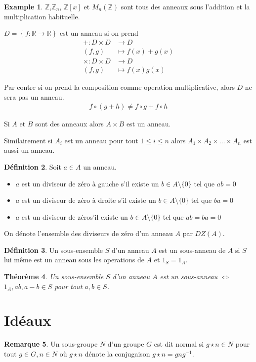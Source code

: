 \documentclass{book}
\theoremstyle{plain}
\newtheorem{thm}{Théorème}[chapter] %
\theoremstyle{definition}
\newtheorem{defn}[thm]{Définition} %
\newtheorem{ex}[thm]{Example} %
\newtheorem{rmrk}[thm]{Remarque}
\begin{document}
\begin{ex}
$\mathbb{Z}$,$\mathbb{Z}_n$, $\mathbb{Z}[x]$ et $M_n\left(\mathbb{Z}\right)$ sont tous des anneaux sous l'addition et la multiplication habituelle.

$D=\left\{ f:\mathbb{R}\rightarrow\mathbb{R}\right\}$ est un anneau si on prend
\begin{align*}
+:D\times D&\rightarrow D\\
(f,g)&\mapsto f(x)+g(x)\\
\times:D\times D&\rightarrow D\\
(f,g)&\mapsto f(x)g(x)
\end{align*}

Par contre si on prend la composition comme operation multiplicative, alors $D$ ne sera pas un anneau.
\begin{align*}
f\circ(g+h)\neq f\circ g+f\circ h
\end{align*}

Si $A$ et $B$ sont des anneaux alors $A\times B$ est un anneau.

Similairement si $A_i$ est un anneau pour tout $1\leq i\leq n$ alors $A_1\times A_2\times...\times A_n$ est aussi un anneau.
\end{ex}

\begin{defn}
\label{def:ring-div0}
Soit $a\in A$ un anneau.

\begin{itemize}
\item $a$ est un diviseur de zéro à gauche s'il existe un $b\in A\setminus\{0\}$ tel que $ab=0$
\item $a$ est un diviseur de zéro à droite s'il existe un $b\in A\setminus\{0\}$ tel que $ba=0$
\item $a$ est un diviseur de zéros'il existe un $b\in A\setminus\{0\}$ tel que $ab=ba=0$
\end{itemize}

On dénote l'ensemble des diviseurs de zéro d'un anneau $A$ par $DZ(A)$.
\end{defn}

\begin{defn}
Un sous-ensemble  $S$ d'un anneau $A$ est un sous-anneau de $A$ si $S$ lui même est un anneau sous les operations de $A$ et $1_S=1_A$.
\end{defn}

\begin{thm}
Un sous-ensemble $S$ d'un anneau $A$ est un sous-anneau $\iff$ $1_A,ab, a-b\in S$ pour tout $a,b\in S$.
\end{thm}

\section{Idéaux}
\label{sec:ideal}
\begin{rmrk}
Un sous-groupe $N$ d'un groupe $G$ est dit normal si $g\star n\in N$ pour tout $g\in G,n\in N$ où $g\star n$ dénote la  conjugaison $g\star n=gng^{-1}$.
\end{rmrk}
\end{document}

